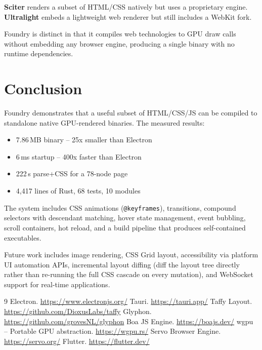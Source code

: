 \documentclass[11pt,twocolumn]{article}
\begin{document}
\textbf{Sciter} renders a subset of HTML/CSS natively but uses a proprietary engine. \textbf{Ultralight} embeds a lightweight web renderer but still includes a WebKit fork.

Foundry is distinct in that it compiles web technologies to GPU draw calls without embedding any browser engine, producing a single binary with no runtime dependencies.

\section{Conclusion}

Foundry demonstrates that a useful subset of HTML/CSS/JS can be compiled to standalone native GPU-rendered binaries. The measured results:

\begin{itemize}
\item 7.86\,MB binary -- 25x smaller than Electron
\item 6\,ms startup -- 400x faster than Electron
\item 222\,\textmu s parse+CSS for a 78-node page
\item 4,417 lines of Rust, 68 tests, 10 modules
\end{itemize}

The system includes CSS animations (\texttt{@keyframes}), transitions, compound selectors with descendant matching, hover state management, event bubbling, scroll containers, hot reload, and a build pipeline that produces self-contained executables.

Future work includes image rendering, CSS Grid layout, accessibility via platform UI automation APIs, incremental layout diffing (diff the layout tree directly rather than re-running the full CSS cascade on every mutation), and WebSocket support for real-time applications.

\begin{thebibliography}{9}
 Electron. \url{https://www.electronjs.org/}
 Tauri. \url{https://tauri.app/}
 Taffy Layout. \url{https://github.com/DioxusLabs/taffy}
 Glyphon. \url{https://github.com/grovesNL/glyphon}
 Boa JS Engine. \url{https://boajs.dev/}
 wgpu -- Portable GPU abstraction. \url{https://wgpu.rs/}
 Servo Browser Engine. \url{https://servo.org/}
 Flutter. \url{https://flutter.dev/}
\end{thebibliography}
\end{document}
